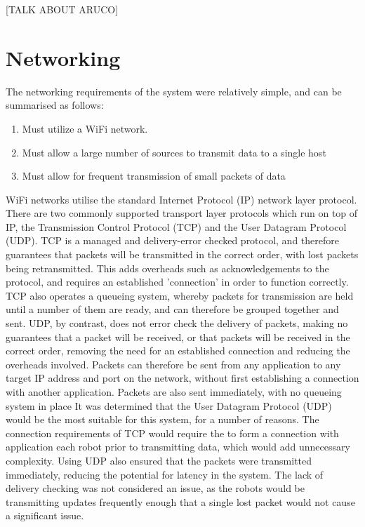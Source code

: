 [TALK ABOUT ARUCO]


\section{Networking}
The networking requirements of the system were relatively simple, and can be summarised as follows:

\begin{enumerate}
	\item Must utilize a WiFi network.
	\item Must allow a large number of sources to transmit data to a single host
	\item Must allow for frequent transmission of small packets of data
\end{enumerate}

WiFi networks utilise the standard Internet Protocol (IP) network layer protocol. There are two commonly supported transport layer protocols which run on top of IP, the Transmission Control Protocol (TCP) and the User Datagram Protocol (UDP). TCP is a managed and delivery-error checked protocol, and therefore guarantees that packets will be transmitted in the correct order, with lost packets being retransmitted. This adds overheads such as acknowledgements to the protocol, and requires an established 'connection' in order to function correctly. TCP also operates a queueing system, whereby packets for transmission are held until a number of them are ready, and can therefore be grouped together and sent. UDP, by contrast, does not error check the delivery of packets, making no guarantees that a packet will be received, or that packets will be received in the correct order, removing the need for an established connection and reducing the overheads involved. Packets can therefore be sent from any application to any target IP address and port on the network, without first establishing a connection with another application. Packets are also sent immediately, with no queueing system in place It was determined that the User Datagram Protocol (UDP) would be the most suitable for this system, for a number of reasons. The connection requirements of TCP would require the to form a connection with application each robot prior to transmitting data, which would add unnecessary complexity. Using UDP also ensured that the packets were transmitted immediately, reducing the potential for latency in the system. The lack of delivery checking was not considered an issue, as the robots would be transmitting updates frequently enough that a single lost packet would not cause a significant issue.

